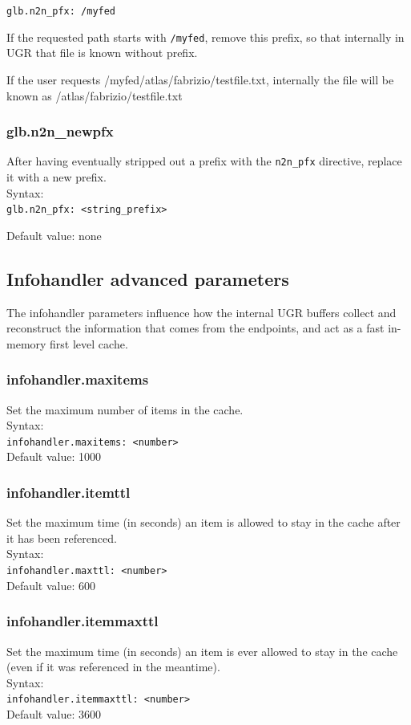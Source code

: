 \documentclass[12pt]{article} %
\begin{document}
\verb"glb.n2n_pfx: /myfed"

If the requested path starts with \verb"/myfed", remove this prefix, so that internally in UGR that file is known without prefix.

If the user requests /myfed/atlas/fabrizio/testfile.txt, internally the file will be known as /atlas/fabrizio/testfile.txt
 
\subsubsection{glb.n2n\_newpfx}

After having eventually stripped out a prefix with the \verb"n2n_pfx" directive, replace it with a new prefix.\\
Syntax:\\
\verb"glb.n2n_pfx: <string_prefix>"

Default value: none




\subsection{Infohandler advanced parameters}
The infohandler parameters influence how the internal UGR buffers collect  and reconstruct the information that comes from the endpoints, and act as a fast in-memory first level cache.



\subsubsection{infohandler.maxitems}
Set the maximum number of items in the cache.\\
Syntax:\\
\verb"infohandler.maxitems: <number>"\\

Default value: 1000

\subsubsection{infohandler.itemttl}
Set the maximum time (in seconds) an item is allowed to stay in the cache after it has been referenced.\\
Syntax:\\
\verb"infohandler.maxttl: <number>"\\
Default value: 600



\subsubsection{infohandler.itemmaxttl}
Set the maximum time (in seconds) an item is ever allowed to stay in the cache (even if it was referenced in the meantime).\\
Syntax:\\
\verb"infohandler.itemmaxttl: <number>"\\
Default value: 3600
\end{document}
